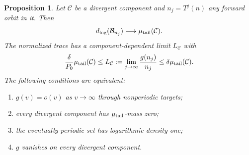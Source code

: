 \documentclass[11pt,a4paper]{article}
\newtheorem{proposition}[theorem]{Proposition}
\begin{document}
\begin{proposition}\label{prop:ct-forward-components}
Let \(\mathcal C\) be a divergent component and
\(n_j=T^j(n)\) any forward orbit in it. Then
\[
 d_{\log}(\mathcal B_{n_j})\longrightarrow\mu_{\rm tail}(\mathcal C).
\]
The normalized trace has a component-dependent limit \(L_{\mathcal C}\)
with
\begin{equation}\label{eq:ct-component-ratio}
 \frac{\delta}{P_0}\mu_{\rm tail}(\mathcal C)
       \le L_{\mathcal C}
       :=\lim_{j\to\infty}\frac{g(n_j)}{n_j}
       \le\delta\mu_{\rm tail}(\mathcal C).
\end{equation}
The following conditions are equivalent:
\begin{enumerate}
\item \(g(v)=o(v)\) as \(v\to\infty\) through nonperiodic targets;
\item every divergent component has \(\mu_{\rm tail}\)-mass zero;
\item the eventually-periodic set has logarithmic density one;
\item \(g\) vanishes on every divergent component.
\end{enumerate}
\end{proposition}
\end{document}
